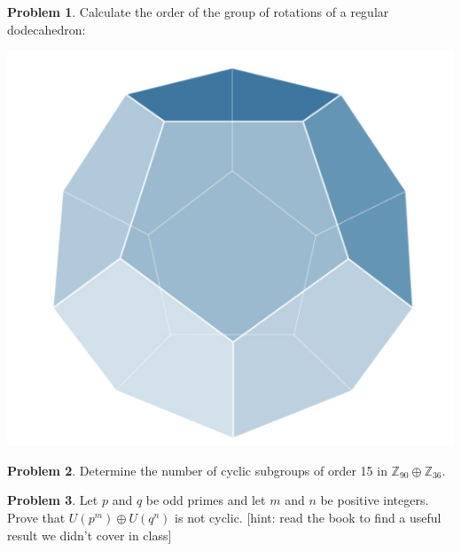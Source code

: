 \documentclass[12pt,reqno]{article}
\theoremstyle{plain}
\theoremstyle{definition}
\newtheorem{problem}{Problem}
\begin{document}
\begin{problem} 
    Calculate the order of the group of rotations of a regular dodecahedron:
    \begin{center}
        \includegraphics[height = 1.6 in]{Screenshot 2023-03-03 at 1.12.39 PM.png}
    \end{center}
\end{problem}

\newpage
    

\begin{problem} 
    Determine the number of cyclic subgroups of order 15 in $\mathbb{Z}_{90} \oplus \mathbb{Z}_{36}$.
\end{problem}

\newpage
    

\begin{problem} 
    Let $p$ and $q$ be odd primes and let $m$ and $n$ be positive integers. Prove that $U(p^m) \oplus U(q^n)$ is not cyclic. [hint: read the book to find a useful result we didn't cover in class]
\end{problem}
\end{document}
